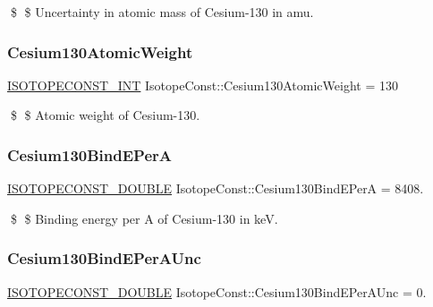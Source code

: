 \$ \$ Uncertainty in atomic mass of Cesium-\/130 in amu. \mbox{\label{group___isotope_const-_cesium-_cs130_gac157d03c8bdd47b87226bff367a75462}} 
\subsubsection{\texorpdfstring{Cesium130\+Atomic\+Weight}{Cesium130AtomicWeight}}
{\footnotesize\ttfamily \mbox{\hyperlink{group___isotope_const-_macros_ga5f18360b3e99483a35c32d789e62621c}{I\+S\+O\+T\+O\+P\+E\+C\+O\+N\+S\+T\+\_\+\+I\+NT}} Isotope\+Const\+::\+Cesium130\+Atomic\+Weight = 130}

\$ \$ Atomic weight of Cesium-\/130. \mbox{\label{group___isotope_const-_cesium-_cs130_gacbed70180f4dd7dd21e6c40e4ec80012}} 
\subsubsection{\texorpdfstring{Cesium130\+Bind\+E\+PerA}{Cesium130BindEPerA}}
{\footnotesize\ttfamily \mbox{\hyperlink{group___isotope_const-_macros_ga8f45a7272ce02c0b4c65c44636ed719a}{I\+S\+O\+T\+O\+P\+E\+C\+O\+N\+S\+T\+\_\+\+D\+O\+U\+B\+LE}} Isotope\+Const\+::\+Cesium130\+Bind\+E\+PerA = 8408.}

\$ \$ Binding energy per A of Cesium-\/130 in keV. \mbox{\label{group___isotope_const-_cesium-_cs130_ga0ef32db3d1d01541d8bf523e203fd5d0}} 
\subsubsection{\texorpdfstring{Cesium130\+Bind\+E\+Per\+A\+Unc}{Cesium130BindEPerAUnc}}
{\footnotesize\ttfamily \mbox{\hyperlink{group___isotope_const-_macros_ga8f45a7272ce02c0b4c65c44636ed719a}{I\+S\+O\+T\+O\+P\+E\+C\+O\+N\+S\+T\+\_\+\+D\+O\+U\+B\+LE}} Isotope\+Const\+::\+Cesium130\+Bind\+E\+Per\+A\+Unc = 0.}


